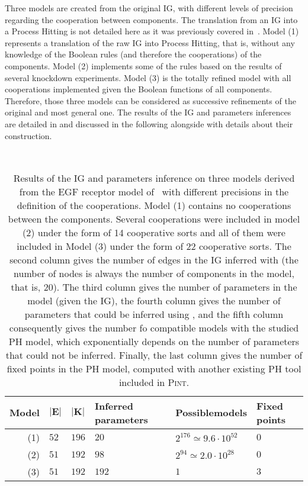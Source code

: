 Three models are created from the original IG, with different levels of precision regarding the cooperation between components.
The translation from an IG into a Process Hitting is not detailed here as it was previously covered in~\cite{PMR10-TCSB}.
Model (1) represents a translation of the raw IG into Process Hitting, that is,
without any knowledge of the Boolean rules (and therefore the cooperations) of the components.
Model (2) implements some of the rules based on the results of several knockdown experiments.
Model (3) is the totally refined model with all cooperations implemented given the Boolean functions of all components.
Therefore, those three models can be considered as successive refinements of the original and most general one.
The results of the IG and parameters inferences are detailed in 
and discussed in the following alongside with details about their construction.

\begin{table}[ht]
~\hfill%
  \begin{tabular}{r|l|l|m{2cm}|m{2.5cm}|m{1.5cm}}
    \textbf{Model} & $\mathbf{|E|}$ & $\mathbf{|K|}$ & \textbf{Inferred parameters} & \textbf{Possible\newline models} & \textbf{Fixed points}
  \\\hline\hline
    (1) & $52$ & $196$ & $20$ & $2^{176}\simeq 9.6\cdot10^{52}$ & $0$   %
  \\\hline
    (2) & $51$ & $192$ & $98$ & $2^{94}\simeq 2.0\cdot10^{28}$ & $0$    %
  \\\hline
    (3) & $51$ & $192$ & $192$ & $1$ & $3$                              %
  \\\hline
  \end{tabular}
\hfill~%
  \caption{%
  Results of the IG and parameters inference on three models
  derived from the EGF receptor model of~\cite{Sahin09}
  with different precisions in the definition of the cooperations.
  Model (1) contains no cooperations between the components.
  Several cooperations were included in model (2) under the form of 14 cooperative sorts
  and all of them were included in Model (3) under the form of 22 cooperative sorts.
  The second column gives the number of edges in the IG inferred with 
  (the number of nodes is always the number of components in the model, that is, 20).
  The third column gives the number of parameters in the model (given the IG),
  the fourth column gives the number of parameters that could be inferred using ,
  and the fifth column consequently gives the number fo compatible models with the studied PH model,
  which exponentially depends on the number of parameters that could not be inferred.
  Finally, the last column gives the number of fixed points in the PH model,
  computed with another existing PH tool included in \textsc{Pint}.
  }
  \label{tb:egfr20}
\end{table}

